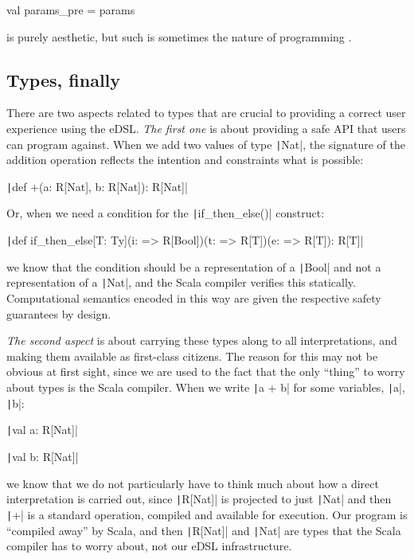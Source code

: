 \documentclass[11pt]{article}
\newcommand{\Scala}[1]{\texttt|#1|}
\newcommand{\ScalaI}[1]{\texttt|#1|}
\newcommand{\OneTwoThreeX}[1]{\marginpar{\faCubes{ \smaller #1}}\xspace}
\newcommand{\OneTwoThree}{\OneTwoThreeX{}}
\newcommand{\FirstEtcX}[1]{\marginpar{\faCube{ \smaller #1}}\xspace}
\newcommand{\FirstEtc}{\FirstEtcX{}}
\begin{document}
\begin{ScalaBlockSimple}
val params_pre = params
\end{ScalaBlockSimple}

\noindent is purely aesthetic, but such is sometimes the nature of programming \cite{knuth:turing:lecture}.


\subsection{Types, finally}
\label{sec:types}
There are two\OneTwoThree aspects related to types that are crucial to providing a correct user experience using the eDSL. \textit{The first one}\FirstEtc is about providing a safe API that users can program against. When we add two values of type \ScalaI{Nat}, the signature of the addition operation reflects the intention and constraints what is possible:

\ScalaI{def +(a: R[Nat], b: R[Nat]): R[Nat]}

\noindent Or, when we need a condition for the \ScalaI{if_then_else()} construct:

\ScalaI{def if_then_else[T: Ty](i: => R[Bool])(t: => R[T])(e: => R[T]): R[T]}

\noindent we know that the condition should be a representation of a \ScalaI{Bool} and not a representation of a \ScalaI{Nat}, and the Scala compiler verifies this statically. Computational semantics encoded in this way are given the respective safety guarantees by design.

\textit{The second aspect}\FirstEtc is about carrying these types along to all interpretations, and making them available as first-class citizens. The reason for this may not be obvious at first sight, since we are used to the fact that the only ``thing'' to worry about types is the Scala compiler. When we write \ScalaI{a + b} for some variables, \ScalaI{a}, \ScalaI{b}:

\ScalaI{val a: R[Nat]}

\ScalaI{val b: R[Nat]}

we know that we do not particularly have to think much about how a direct interpretation is carried out, since \ScalaI{R[Nat]} is projected to just \Scala{Nat} and then \ScalaI{+} is a standard operation, compiled and available for execution. Our program is ``compiled away'' by Scala, and then \ScalaI{R[Nat]} and \ScalaI{Nat} are types that the Scala compiler has to worry about, not our eDSL infrastructure.
\end{document}
